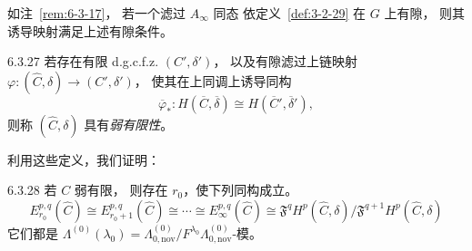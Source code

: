 如注~\ref{rem:6-3-17}，
若一个滤过 $A_\infty$ 同态
依定义~\ref{def:3-2-29}
在 $G$ 上有隙，
则其诱导映射满足上述有隙条件。

\begin{definition}{6.3.27}\label{def:6-3-27}
若存在有限 d.g.c.f.z.
$(C',\delta')$，
以及有隙滤过上链映射
$\varphi:(\widehat C,\delta)
\to(C',\delta')$，
使其在上同调上诱导同构
\[
\overline\varphi_*:
H(\overline C,\overline\delta)
\cong H(\overline C',\overline\delta'),
\]
则称 $(\widehat C,\delta)$
具有\emph{弱有限性}。
\end{definition}

利用这些定义，我们证明：

\begin{theorem}{6.3.28}\label{thm:6-3-28}
若 $C$ 弱有限，
则存在 $r_0$，使下列同构成立。
\[
E_{r_0}^{p,q}(\widehat C)
\cong E_{r_0+1}^{p,q}(\widehat C)
\cong\cdots\cong
E_\infty^{p,q}(\widehat C)
\cong
\mathfrak F^qH^p(\widehat C,\delta)
/\mathfrak F^{q+1}H^p(\widehat C,\delta)
\]
它们都是
$\Lambda^{(0)}(\lambda_0)
=\Lambda_{0,\mathrm{nov}}^{(0)}
/F^{\lambda_0}\Lambda_{0,\mathrm{nov}}^{(0)}$-模。
\end{theorem}

